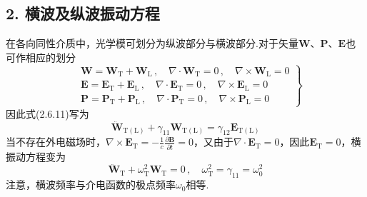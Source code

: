 \subsection*{2. 横波及纵波振动方程}

在各向同性介质中，光学模可划分为纵波部分与横波部分.对于矢量$\boldsymbol{W}$、$\boldsymbol{P}$、$\boldsymbol{E}$也可作相应的划分
\begin{equation}
\left.\begin{aligned}
  &\boldsymbol{W}=\boldsymbol{W}_{\mathrm{T}}+\boldsymbol{W}_{\mathrm{L}}\,,\quad
  \nabla\cdot\boldsymbol{W}_{\mathrm{T}}=0\,,\quad\nabla\times\boldsymbol{W}_{\mathrm{L}}=0\\
  &\boldsymbol{E}=\boldsymbol{E}_{\mathrm{T}}+\boldsymbol{E}_{\mathrm{L}}\,,\quad
  \nabla\cdot\boldsymbol{E}_{\mathrm{T}}=0\,,\quad\nabla\times\boldsymbol{E}_{\mathrm{L}}=0\\
  &\boldsymbol{P}=\boldsymbol{P}_{\mathrm{T}}+\boldsymbol{P}_{\mathrm{L}}\,,\quad
  \nabla\cdot\boldsymbol{P}_{\mathrm{T}}=0\,,\quad\nabla\times\boldsymbol{P}_{\mathrm{L}}=0
\end{aligned}\right\}
\end{equation}
因此式(2.6.11)写为
\begin{equation}
  \ddot{\boldsymbol{W}}_{\mathrm{T(L)}}+\gamma_{11}\boldsymbol{W}_{\mathrm{T(L)}}
  =\gamma_{12}\boldsymbol{E}_{\mathrm{T(L)}}
\end{equation}
当不存在外电磁场时，$\nabla\times\boldsymbol{E}_{\mathrm{T}}
=-\frac{1}{c}\frac{\partial\boldsymbol{B}}{\partial t}=0$，又由于$\nabla\cdot\boldsymbol{E}_{\mathrm{T}}=0$，因此$\boldsymbol{E}_{\mathrm{T}}=0$，横振动方程变为
\begin{equation}
  \ddot{\boldsymbol{W}}_{\mathrm{T}}+\omega_{\mathrm{T}}^2\boldsymbol{W}_{\mathrm{T}}=0\,,
  \quad\omega_{\mathrm{T}}^2=\gamma_{11}=\omega_0^2
\end{equation}
注意，横波频率与介电函数的极点频率$\omega_0$相等.

